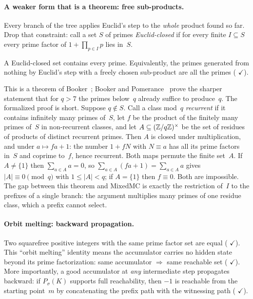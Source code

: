 \paragraph{A weaker form that is a theorem: free sub-products.}
Every branch of the tree applies Euclid's step to the \emph{whole}
product found so far.  Drop that constraint: call a set $S$ of primes
\emph{Euclid-closed} if for every finite $I \subseteq S$ every prime
factor of $1 + \prod_{p \in I} p$ lies in~$S$.
\begin{theorem}
A Euclid-closed set contains every prime.  Equivalently, the primes
generated from nothing by Euclid's step with a freely chosen
sub-product are all the primes
( {\color{leanink}$\checkmark$}).
\end{theorem}
\noindent
This is a theorem of Booker~\cite{Booker2016}; Booker and
Pomerance~\cite{BoPo2017} prove the sharper statement that for
$q > 7$ the primes below~$q$ already suffice to produce~$q$.  The
formalized proof is short.  Suppose $q \notin S$.  Call a class mod~$q$
\emph{recurrent} if it contains infinitely many primes of~$S$, let $f$
be the product of the finitely many primes of~$S$ in non-recurrent
classes, and let $A \subseteq (\mathbb{Z}/q\mathbb{Z})^\times$ be the set of residues
of products of distinct recurrent primes.  Then $A$ is closed under
multiplication, and under $a \mapsto fa + 1$: the number $1 + fN$ with
$N \equiv a$ has all its prime factors in~$S$ and coprime to~$f$,
hence recurrent.  Both maps permute the finite set~$A$.  If
$A \neq \{1\}$ then $\sum_{a \in A} a = 0$, so
$\sum_{a\in A}(fa+1) = \sum_{a \in A} a$ gives $|A| \equiv 0 \pmod q$
with $1 \le |A| < q$; if $A = \{1\}$ then $f \equiv 0$.  Both are
impossible.  The gap between this theorem and $\mathrm{MixedMC}$ is
exactly the restriction of~$I$ to the prefixes of a single branch: the
argument multiplies many primes of one residue class, which a prefix
cannot select.

\paragraph{Orbit melting: backward propagation.}
Two squarefree positive integers with the same prime factor set are
equal
(
{\color{leanink}$\checkmark$}).
This ``orbit melting'' identity means the accumulator carries no
hidden state beyond its prime factorization:
same accumulator $\Rightarrow$ same reachable set
(
{\color{leanink}$\checkmark$}).
More importantly, a good accumulator at \emph{any} intermediate step
propagates backward: if $P_\sigma(K)$ supports full reachability,
then $-1$ is reachable from the starting point~$m$ by concatenating
the prefix path with the witnessing path
(
{\color{leanink}$\checkmark$}).

